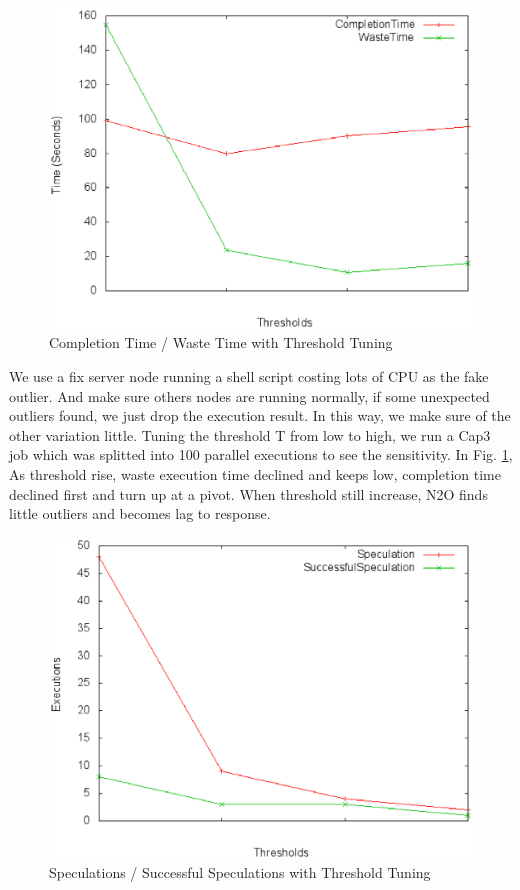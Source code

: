 \begin{figure}
\centering
\includegraphics[width=0.9\columnwidth]{figures/threshold&completiontime.eps}
\caption{Completion Time / Waste Time with Threshold Tuning}
\label{figure:thresholdtuning}
\end{figure}

We use a fix server node running a shell script costing lots of CPU as the fake outlier. And make sure others nodes are running normally, if some unexpected outliers found, we just drop the execution result. In this way, we make sure of the other variation little. Tuning the threshold T from low to high, we run a Cap3 job which was splitted into 100 parallel executions to see the sensitivity. In Fig. \ref{figure:thresholdtuning}, As threshold rise, waste execution time declined and keeps low, completion time declined first and  turn up at a pivot. When threshold still increase, N2O finds little outliers and becomes lag to response. 

\begin{figure}
\centering
\includegraphics[width=0.9\columnwidth]{figures/threshold&speculation.eps}
\caption{Speculations / Successful Speculations with Threshold Tuning}
\label{figure:yetanotherthresholdtuning}
\end{figure}

